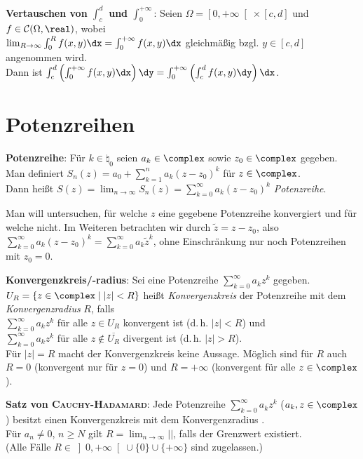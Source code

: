 \textbf{Vertauschen von $\int_c^d$ und $\int_0^{+\infty}$}:
Seien $\Omega = \left[0, +\infty\right[ \times [c,d]$ und
$f \in \C(\Omega, \real)$, wobei \\
$\lim_{R \to \infty} \int_0^R f(x,y)\dx = \int_0^{+\infty} f(x,y)\dx$
gleichmäßig bzgl. $y \in [c,d]$ angenommen wird. \\
Dann ist $\int_c^d \left(\int_0^{+\infty} f(x,y)\dx\right)\dy =
\int_0^{+\infty} \left(\int_c^d f(x,y)\dy\right)\dx$.

\section{%
    Potenzreihen%
}

\textbf{Potenzreihe}:
Für $k \in \natural_0$ seien $a_k \in \complex$ sowie $z_0 \in \complex$
gegeben. \\
Man definiert $S_n(z) = a_0 + \sum_{k=1}^n a_k(z - z_0)^k$ für
$z \in \complex$. \\
Dann heißt $S(z) = \lim_{n \to \infty} S_n(z) =
\sum_{k=0}^\infty a_k(z - z_0)^k$ \emph{Potenzreihe}.

Man will untersuchen, für welche $z$ eine gegebene Potenzreihe konvergiert
und für welche nicht.
Im Weiteren betrachten wir durch $\widetilde{z} = z - z_0$, also
$\sum_{k=0}^\infty a_k (z - z_0)^k = \sum_{k=0}^\infty a_k \widetilde{z}^k$,
ohne Einschränkung nur noch Potenzreihen mit $z_0 = 0$.

\textbf{Konvergenzkreis/-radius}:
Sei eine Potenzreihe $\sum_{k=0}^\infty a_k z^k$ gegeben.
$U_R = \{z \in \complex \;|\; |z| < R\}$ heißt \emph{Konvergenzkreis}
der Potenzreihe mit dem \emph{Konvergenzradius} $R$, falls \\
$\sum_{k=0}^\infty a_k z^k$ für alle $z \in U_R$ konvergent ist
(d.\,h. $|z| < R$) und \\
$\sum_{k=0}^\infty a_k z^k$ für alle $z \notin \overline{U_R}$ divergent ist
(d.\,h. $|z| > R$). \\
Für $|z| = R$ macht der Konvergenzkreis keine Aussage.
Möglich sind für $R$ auch $R = 0$ (konvergent nur für $z = 0$)
und $R = +\infty$ (konvergent für alle $z \in \complex$).

\linie
\pagebreak

\textbf{Satz von \textsc{Cauchy}-\textsc{Hadamard}}:
Jede Potenzreihe $\sum_{k=0}^\infty a_k z^k$ ($a_k, z \in \complex$)
besitzt einen Konvergenzkreis mit dem Konvergenzradius
. \\
Für $a_n \not= 0$, $n \ge N$ gilt
$R = \lim_{n \to \infty} \Big|$$\Big|$, falls
der Grenzwert existiert. \\
(Alle Fälle $R \in \left]0, +\infty\right[ \cup \{0\} \cup \{+\infty\}$
sind zugelassen.)

